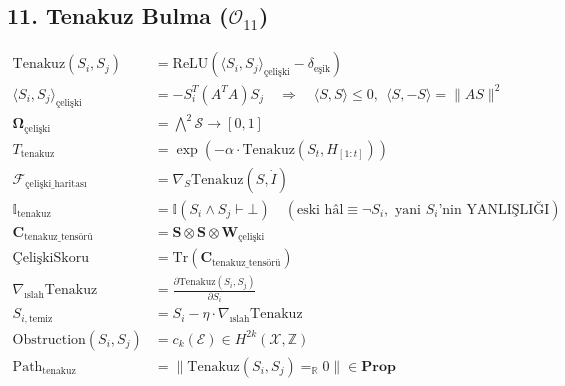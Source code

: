 \documentclass[11pt, a4paper]{article}
\begin{document}
\subsection{11. Tenakuz Bulma ($\mathcal{O}_{11}$)}
\begin{align}
\text{Tenakuz}(S_i, S_j) &= \text{ReLU}\left( \langle S_i, S_j \rangle_{\text{çelişki}} - \delta_{\text{eşik}} \right) \\
\langle S_i, S_j \rangle_{\text{çelişki}} &= -S_i^T (A^T A) S_j \quad \Rightarrow \quad \langle S,S \rangle \le 0, \ \ \langle S, -S \rangle = \|AS\|^2 \\
\mathbf{\Omega}_{\text{çelişki}} &= \bigwedge^2 \mathcal{S} \to [0, 1] \\
T_{\text{tenakuz}} &= \exp\left( -\alpha \cdot \text{Tenakuz}(S_t, H_{[1:t]}) \right) \\
\mathcal{F}_{\text{çelişki\_haritası}} &= \nabla_S \text{Tenakuz}(S, \dot{I}) \\
\mathbb{I}_{\text{tenakuz}} &= \mathbb{I}\left( S_i \land S_j \vdash \bot \right) \quad (\text{eski hâl} \equiv \neg S_i, \text{ yani } S_i\text{'nin YANLIŞLIĞI}) \\
\mathbf{C}_{\text{tenakuz\_tensörü}} &= \mathbf{S} \otimes \mathbf{S} \otimes \mathbf{W}_{\text{çelişki}} \\
\text{ÇelişkiSkoru} &= \text{Tr}(\mathbf{C}_{\text{tenakuz\_tensörü}}) \\
\nabla_{\text{ıslah}} \text{Tenakuz} &= \frac{\partial \text{Tenakuz}(S_i, S_j)}{\partial S_i} \\
S_{i, \text{temiz}} &= S_i - \eta \cdot \nabla_{\text{ıslah}} \text{Tenakuz} \\
\text{Obstruction}(S_i, S_j) &= c_k(\mathcal{E}) \in H^{2k}(\mathcal{X}, \mathbb{Z}) \\
\text{Path}_{\text{tenakuz}} &= \big\| \text{Tenakuz}(S_i, S_j) =_{\mathbb{R}} 0 \big\| \in \mathbf{Prop}
\end{align}
\end{document}
